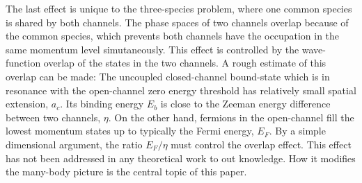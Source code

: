 \documentclass[reprint,pra]{revtex4-1}
\begin{document}
The last effect is unique to the three-species problem, where one common species is shared by both channels.  The phase spaces of two channels overlap because of  the common species, which prevents both channels have the occupation in the same momentum level simutaneously. This effect is controlled by the wave-function overlap of the states in the two channels. A rough estimate of this overlap can be made: The uncoupled closed-channel bound-state which is in resonance with the open-channel zero energy threshold has  relatively small  spatial extension, $a_c$.  Its binding energy $E_b$ is close to the Zeeman energy difference between two channels, $\eta$.  On the other hand, fermions in the open-channel fill the lowest  momentum states up to typically the Fermi energy, $E_F$.  By a simple dimensional argument, the ratio $E_F/\eta$ must control the overlap effect. This effect has  not been addressed in any theoretical work to out knowledge.  How it modifies the many-body picture is the central topic of this paper. 

\end{document}

